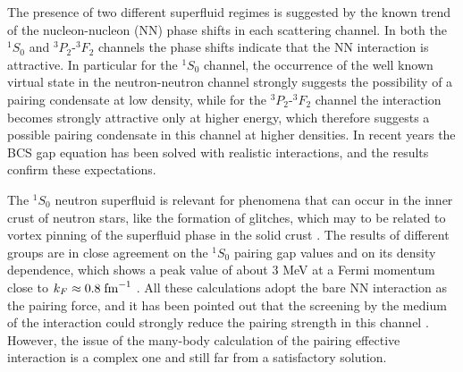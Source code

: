 \documentclass{ws-p9-75x6-50}
\begin{document}
The presence of two different superfluid regimes 
is suggested by the known trend of the 
nucleon-nucleon (NN) phase shifts 
in each scattering channel. 
In both the $^1S_0$ and $^3P_2$-$^3F_2$ channels the
phase shifts indicate that the NN interaction is attractive. 
In particular for the $^1S_0$ channel, the occurrence of 
the well known virtual state in the neutron-neutron channel
strongly suggests the possibility of a 
pairing condensate at low density, 
while for the $^3P_2$-$^3F_2$ channel the 
interaction becomes strongly attractive only
at higher energy, which therefore suggests a possible 
pairing condensate
in this channel at higher densities. 
In recent years the BCS gap equation
has been solved with realistic interactions, 
and the results confirm
these expectations. 

The $^1S_0$ neutron superfluid is relevant for phenomena
that can occur in the inner crust of neutron stars, like the 
formation of glitches, which may to be related to vortex pinning  
of the superfluid phase in the solid crust \cite{glitch}. 
The results of different groups are in close agreement
on the $^1S_0$ pairing gap values and on 
its density dependence, which
shows a peak value of about 3 MeV at a Fermi momentum close to
$k_F \approx 0.8\; {\rm fm}^{-1}$ \cite{bcll90,kkc96,eh98,sclbl96}. 
All these calculations adopt the bare
NN interaction as the pairing force, and it has been pointed out
that the screening by the medium of the interaction 
could strongly reduce
the pairing strength in this channel \cite{sclbl96,chen86,ains89}. 
However, the issue of the 
many-body calculation of the pairing 
effective interaction is a complex
one and still far from a satisfactory solution.
\end{document}
